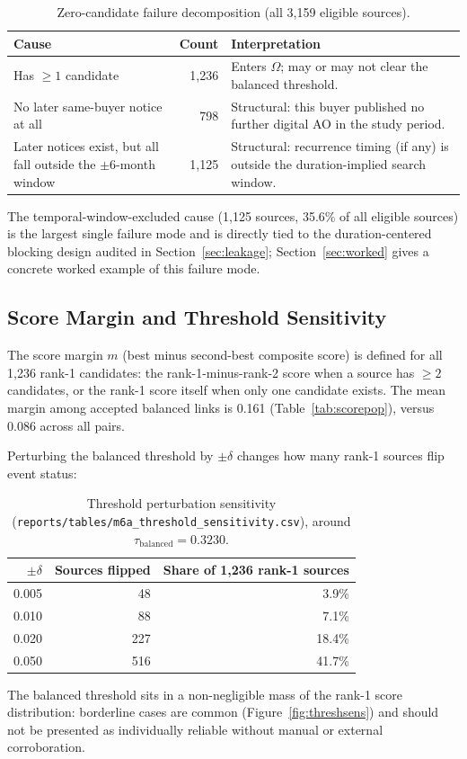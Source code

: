 \documentclass[11pt]{article}
\begin{document}
\begin{table}[h!]
\centering
\caption{Zero-candidate failure decomposition (all 3{,}159 eligible sources).}
\begin{tabular}{p{}rp{}}
\toprule
Cause & Count & Interpretation \\
\midrule
Has $\geq 1$ candidate & 1{,}236 & Enters $\Omega$; may or may not clear the balanced threshold. \\
No later same-buyer notice at all & 798 & Structural: this buyer published no further digital AO in the study period. \\
Later notices exist, but all fall outside the $\pm 6$-month window & 1{,}125 & Structural: recurrence timing (if any) is outside the duration-implied search window. \\
\bottomrule
\end{tabular}
\end{table}
The temporal-window-excluded cause (1{,}125 sources, 35.6\% of all
eligible sources) is the largest single failure mode and is directly tied
to the duration-centered blocking design audited in
Section~\ref{sec:leakage}; Section~\ref{sec:worked} gives a concrete worked
example of this failure mode.

\subsection{Score Margin and Threshold Sensitivity}
\label{sec:margin}
The score margin $m$ (best minus second-best composite score) is defined
for all 1{,}236 rank-1 candidates: the rank-1-minus-rank-2 score when a
source has $\geq 2$ candidates, or the rank-1 score itself when only one
candidate exists. The mean margin among accepted balanced links is 0.161
(Table~\ref{tab:scorepop}), versus 0.086 across all pairs.

Perturbing the balanced threshold by $\pm\delta$ changes how many rank-1
sources flip event status:

\begin{table}[h!]
\centering
\caption{Threshold perturbation sensitivity
(\texttt{reports/tables/m6a\_threshold\_sensitivity.csv}), around
$\tau_{\text{balanced}}=0.3230$.}
\begin{tabular}{rrr}
\toprule
$\pm\delta$ & Sources flipped & Share of 1{,}236 rank-1 sources \\
\midrule
0.005 & 48 & 3.9\% \\
0.010 & 88 & 7.1\% \\
0.020 & 227 & 18.4\% \\
0.050 & 516 & 41.7\% \\
\bottomrule
\end{tabular}
\end{table}
The balanced threshold sits in a non-negligible mass of the rank-1 score
distribution: borderline cases are common (Figure~\ref{fig:threshsens}) and
should not be presented as individually reliable without manual or external
corroboration.
\end{document}
